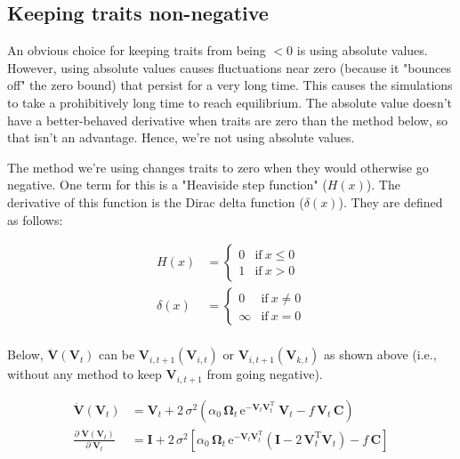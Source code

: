 \subsection*{Keeping traits non-negative}

An obvious choice for keeping traits from being $<0$ is using absolute
values.
However, using absolute values causes fluctuations near zero
(because it "bounces off" the zero bound) that persist for a very long time.
This causes the simulations to take a prohibitively long time to reach
equilibrium.
The absolute value doesn't have a better-behaved derivative when traits are
zero than the method below, so that isn't an advantage.
Hence, we're not using absolute values.


The method we're using changes traits to zero when they would otherwise go
negative.
One term for this is a "Heaviside step function" ($H(x)$).
The derivative of this function is the Dirac delta function
($\delta(x)$).
They are defined as follows:

\begin{align}
    H(x) &= \begin{cases}
        0 & \text{if}\ x \le 0 \\
        1 & \text{if}\ x > 0
        \end{cases} \\
    \delta(x) &= \begin{cases}
        0 & \text{if}\ x \ne 0 \\
        \infty & \text{if}\ x = 0
        \end{cases} \\
\end{align}


Below, $\mathbf{\ddot{V}}(\mathbf{V}_t)$ can be
$\mathbf{V}_{i,t+1}(\mathbf{V}_{i,t})$ or
$\mathbf{V}_{i,t+1}(\mathbf{V}_{k,t})$ as shown above (i.e., without
any method to keep $\mathbf{V}_{i,t+1}$ from going negative).

\begin{align}
    \mathbf{\ddot{V}}(\mathbf{V}_t) &= \mathbf{V}_{t} + 2 \, \sigma^2
    \left(
        \alpha_0 \, \mathbf{\Omega}_{t} \,
            \textrm{e}^{- \mathbf{V}_{t} \mathbf{V}_{t}^{\textrm{T}}} \:
            \mathbf{V}_{t}
        - f \, \mathbf{V}_{t} \, \mathbf{C}
    \right) \\
    \frac{ \partial \; \mathbf{\ddot{V}}(\mathbf{V}_t) }{
        \partial \; \mathbf{V}_{t} } &=
        \mathbf{I} +
        2 \, \sigma^2
        \left[
            \alpha_0 \, \mathbf{\Omega}_{t} \,
            \textrm{e}^{ - \mathbf{V}_{t} \mathbf{V}_{t}^{\textrm{T}} }
            \left(
                \mathbf{I} - 2 \, \mathbf{V}_{t}^{\textrm{T}} \mathbf{V}_{t}
            \right) -
            f \, \mathbf{C}
        \right] \\
\end{align}



